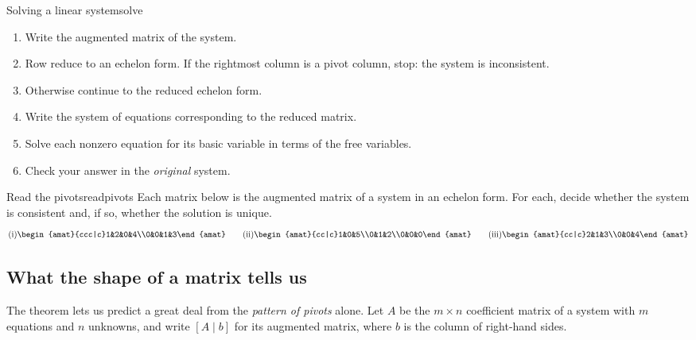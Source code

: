 \documentclass[11pt]{article}
\begin{document}
\begin{proc}{Solving a linear system}{solve}
\begin{enumerate}[itemsep=1pt]
  \item Write the augmented matrix of the system.
  \item Row reduce to an echelon form. If the rightmost column is a pivot column, stop: the system is inconsistent.
  \item Otherwise continue to the reduced echelon form.
  \item Write the system of equations corresponding to the reduced matrix.
  \item Solve each nonzero equation for its basic variable in terms of the free variables.
  \item Check your answer in the \emph{original} system.
\end{enumerate}
\end{proc}
 
\begin{kc}{Read the pivots}{readpivots}
Each matrix below is the augmented matrix of a system in an echelon form. For each, decide whether the system is
consistent and, if so, whether the solution is unique.
\[
\text{(i)}\begin{amat}{ccc|c}1&2&0&4\\0&0&1&3\end{amat}\qquad
\text{(ii)}\begin{amat}{cc|c}1&0&5\\0&1&2\\0&0&0\end{amat}\qquad
\text{(iii)}\begin{amat}{cc|c}2&1&3\\0&0&4\end{amat}
\]
\end{kc}
 
\subsection*{What the shape of a matrix tells us}
 
The theorem lets us predict a great deal from the \emph{pattern of pivots} alone. Let $A$ be the $m\times n$
coefficient matrix of a system with $m$ equations and $n$ unknowns, and write $[A\mid b]$ for its augmented
matrix, where $b$ is the column of right-hand sides.
 
\end{document}
